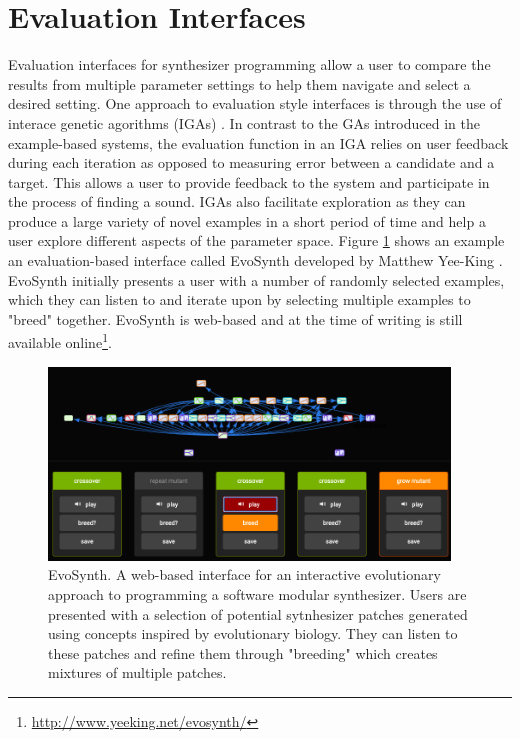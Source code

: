 \section{Evaluation Interfaces}
Evaluation interfaces for synthesizer programming allow a user to compare the results from multiple parameter settings to help them navigate and select a desired setting. One approach to evaluation style interfaces is through the use of interace genetic agorithms (IGAs) \cite{johnson1999exploring, dahlstedt2001creating, yee2016use}. In contrast to the GAs introduced in the example-based systems, the evaluation function in an IGA relies on user feedback during each iteration as opposed to measuring error between a candidate and a target. This allows a user to provide feedback to the system and participate in the process of finding a sound. IGAs also facilitate exploration as they can produce a large variety of novel examples in a short period of time and help a user explore different aspects of the parameter space. Figure \ref{fig:evosynth} shows an example an evaluation-based interface called EvoSynth developed by Matthew Yee-King \cite{yee2016use}. EvoSynth initially presents a user with a number of randomly selected examples, which they can listen to and iterate upon by selecting multiple examples to "breed" together. EvoSynth is web-based and at the time of writing is still available online\footnote{\url{http://www.yeeking.net/evosynth/}}.

\begin{figure}[ht]
    \centering
    \includegraphics[width=0.95\textwidth]{figures/background/EvoSynth.png}
    \caption{EvoSynth. A web-based interface for an interactive evolutionary approach to programming a software modular synthesizer. Users are presented with a selection of potential sytnhesizer patches generated using concepts inspired by evolutionary biology. They can listen to these patches and refine them through "breeding" which creates mixtures of multiple patches.}
    \label{fig:evosynth}
\end{figure}

